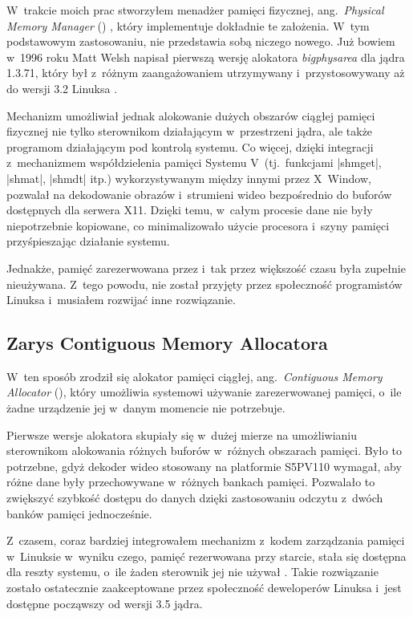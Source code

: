 W~trakcie moich prac stworzyłem menadżer pamięci fizycznej,
ang.\ \textit{Physical Memory Manager} ()
\autocite{patch:pmm}, który implementuje dokładnie te założenia.
W~tym podstawowym zastosowaniu,  nie przedstawia sobą niczego
nowego.  Już bowiem w~1996 roku Matt Welsh napisał pierwszą wersję
alokatora \emph{bigphysarea} dla jądra 1.3.71, który był z~różnym
zaangażowaniem utrzymywany i~przystosowywany aż do wersji 3.2 Linuksa
\autocite{patch:bigphys}.

Mechanizm  umożliwiał jednak alokowanie dużych obszarów
ciągłej pamięci fizycznej nie tylko sterownikom działającym
w~przestrzeni jądra, ale także programom działającym pod kontrolą
systemu. Co więcej, dzięki integracji z~mechanizmem współdzielenia
pamięci Systemu V~(tj.\ funkcjami \code|shmget|, \code|shmat|,
\code|shmdt| itp.)  wykorzystywanym między innymi przez X~Window,
 pozwalał na dekodowanie obrazów i~strumieni wideo
bezpośrednio do buforów dostępnych dla serwera X11.  Dzięki temu,
w~całym procesie dane nie były niepotrzebnie kopiowane, co
minimalizowało użycie procesora i~szyny pamięci przyśpieszając
działanie systemu.

Jednakże, pamięć zarezerwowana przez  i~tak przez większość
czasu była zupełnie nieużywana.  Z~tego powodu,  nie został
przyjęty przez społeczność programistów Linuksa i~musiałem rozwijać
inne rozwiązanie.

\subsection{Zarys Contiguous Memory Allocatora}

W~ten sposób zrodził się alokator pamięci ciągłej, ang.\ \textit{Contiguous
  Memory Allocator} (), który umożliwia systemowi używanie
zarezerwowanej pamięci, o~ile żadne urządzenie jej w~danym momencie
nie potrzebuje.

Pierwsze wersje alokatora  skupiały się w~dużej mierze na
umożliwianiu sterownikom alokowania różnych buforów w~różnych
obszarach pamięci.  Było to potrzebne, gdyż dekoder wideo stosowany na
platformie S5PV110 wymagał, aby różne dane były przechowywane
w~różnych bankach pamięci.  Pozwalało to zwiększyć szybkość dostępu do
danych dzięki zastosowaniu odczytu z~dwóch banków pamięci
jednocześnie.

Z~czasem, coraz bardziej integrowałem mechanizm  z~kodem
zarządzania pamięci w~Linuksie w~wyniku czego, pamięć rezerwowana przy
starcie, stała się dostępna dla reszty systemu, o~ile żaden sterownik
jej nie używał \autocite{patch:cma-24}.  Takie rozwiązanie zostało
ostatecznie zaakceptowane przez społeczność deweloperów Linuksa i~jest
dostępne począwszy od wersji 3.5 jądra.
